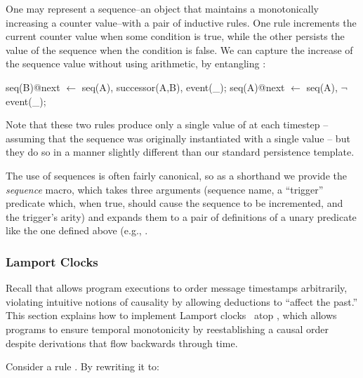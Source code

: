 One may represent a sequence--an object that maintains a monotonically
increasing a counter value--with a pair of inductive rules.  One rule
increments the current counter value when some condition is true, while the
other persists the value of the sequence when the condition is false.  We can
capture the increase of the sequence value without using arithmetic, by
entangling :

\begin{Dedalus}
seq(B)@next \(\leftarrow\) seq(A), successor(A,B), event(_);  
seq(A)@next \(\leftarrow\) seq(A), \(\lnot\)event(_);
\end{Dedalus}

\noindent Note that these two rules produce only a single value of
 at each timestep -- assuming that the sequence was originally
instantiated with a single value -- but they do so in a manner slightly
different than our standard persistence template.

The use of sequences is often fairly canonical, so as a shorthand we provide
the {\em sequence} macro, which takes three arguments (sequence name, a
``trigger'' predicate which, when true, should cause the sequence to be
incremented, and the trigger's arity) and expands them to a pair of definitions
of a unary predicate like the one defined above (e.g., .

\subsubsection{Lamport Clocks}
\label{sec:lamport}


Recall that \lang allows program executions to order message timestamps
arbitrarily, violating intuitive notions of causality by allowing deductions to
``affect the past.'' This section explains how to implement Lamport
clocks~\cite{timeclocks} atop \lang, which allows programs to ensure temporal
monotonicity by reestablishing a causal order despite derivations that flow
backwards through time.  

Consider a rule .  By rewriting it
to:

